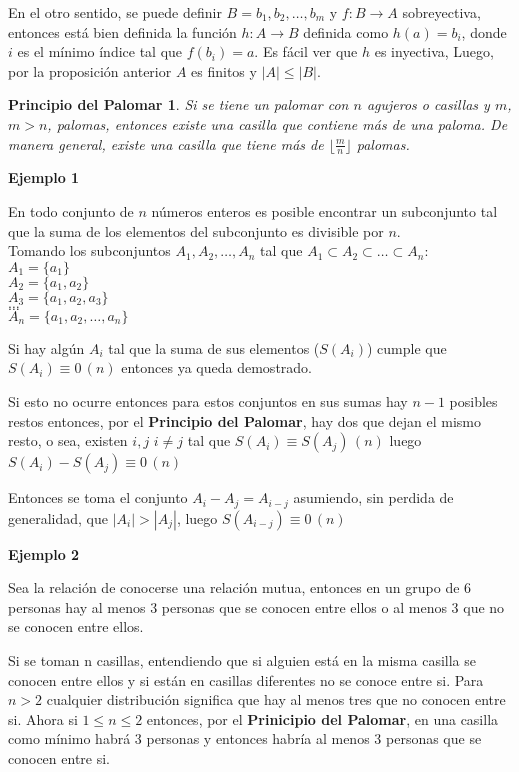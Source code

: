 \documentclass[a4paper,12pt]{report}
\newtheorem*{ppa}{Principio del Palomar}
\begin{document}
En el otro sentido, se puede definir $B={b_1,b_2,\dots,b_m}$ y $f:B\rightarrow A$ sobreyectiva, entonces está bien definida la función $h:A\rightarrow B$ definida como $h(a)=b_i$, donde $i$ es el mínimo índice tal que $f(b_i)=a$. Es fácil ver que $h$ es inyectiva, Luego, por la proposición anterior  $A$ es finitos y $|A|\leq|B|$.

\begin{ppa}
 Si se tiene un palomar con $n$ agujeros o casillas y $m$, $m>n$, palomas, entonces existe una casilla que contiene más de una paloma. De manera general, existe una casilla que tiene más de $\lfloor\frac{m}{n}\rfloor$ palomas.
\end{ppa}

\textbf{Ejemplo 1}

 En todo conjunto de $n$ números enteros es posible encontrar un subconjunto tal que la suma de los elementos del subconjunto es divisible por $n$.\\

 Tomando los subconjuntos $A_1,A_2,\dots,A_n$ tal que $A_1\subset A_2 \subset\dots\subset A_n$:\\
 $A_1=\{a_1\}$\\
 $A_2=\{a_1,a_2\}$\\  
 $A_3=\{a_1,a_2,a_3\}$\\
 $\dots$\\
 $\dots$\\
 $A_n=\{a_1,a_2,\dots,a_n\}$
 
 Si hay algún $A_i$ tal que la suma de sus elementos ($S(A_i)$) cumple que $S(A_i)\equiv 0 \, (n)$ entonces ya queda demostrado.
 
 Si esto no ocurre entonces para estos conjuntos en sus sumas hay $n-1$ posibles restos entonces, por el \textbf{Principio del Palomar}, hay dos que dejan el mismo resto, o sea,
 existen $i,j$ $i\neq j$ tal que $S(A_i)\equiv S(A_j) \, (n)$ luego $S(A_i) - S(A_j)\equiv 0 \, (n)$
 
 Entonces se toma el conjunto $A_i - A_j = A_{i-j}$ asumiendo, sin perdida de generalidad, que $|A_i|>|A_j|$, luego $S(A_{i-j})\equiv 0 \, (n)$
 
 
 \textbf{Ejemplo 2}

 Sea la relación de conocerse una relación mutua, entonces en un grupo de 6 personas hay al menos 3 personas que se conocen entre ellos o al menos 3 que no se conocen entre ellos.
 
 Si se toman n casillas, entendiendo que si alguien está en la misma casilla se conocen entre ellos y si están en casillas diferentes no se conoce entre si. Para $n > 2$ cualquier distribución significa que hay al menos tres que no conocen entre si. Ahora si $1\leq n \leq 2$
 entonces, por el \textbf{Prinicipio del Palomar}, en una casilla como mínimo habrá 3 personas y entonces habría al menos 3 personas que se conocen entre si.
 
 
\end{document}
